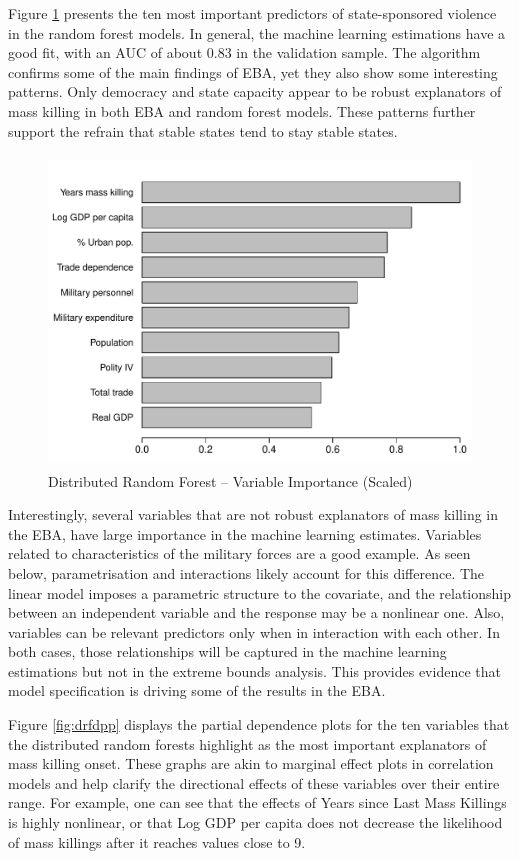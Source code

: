 Figure \ref{fig:drfuv} presents the ten most important predictors of state-sponsored violence in the random forest models. In general, the machine learning estimations have a good fit, with an AUC of about 0.83 in the validation sample. The algorithm confirms some of the main findings of EBA, yet they also show some interesting patterns. Only democracy and state capacity appear to be robust explanators of mass killing in both EBA and random forest models. These patterns further support the refrain that stable states tend to stay stable states. 

\begin{figure}[ht]
    \centering
    \includegraphics[width=.8\textwidth, height=8.25cm]{images/rf-mk.pdf}
    \caption{Distributed Random Forest -- Variable Importance (Scaled)}
    \label{fig:drfuv}
\end{figure}
	
Interestingly, several variables that are not robust explanators of mass killing in the EBA, have large importance in the machine learning estimates. Variables related to characteristics of the military forces are a good example. As seen below, parametrisation and interactions likely account for this difference. The linear model imposes a parametric structure to the covariate, and the relationship between an independent variable and the response may be a nonlinear one. Also, variables can be relevant predictors only when in interaction with each other. In both cases, those relationships will be captured in the machine learning estimations but not in the extreme bounds analysis. This provides evidence that model specification is driving some of the results in the EBA. 

Figure \ref{fig:drfdpp} displays the partial dependence plots for the ten variables that the distributed random forests highlight as the most important explanators of mass killing onset. These graphs are akin to marginal effect plots in correlation models and help clarify the directional effects of these variables over their entire range. For example, one can see that the effects of Years since Last Mass Killings is highly nonlinear, or that Log GDP per capita does not decrease the likelihood of mass killings after it reaches values close to 9.

